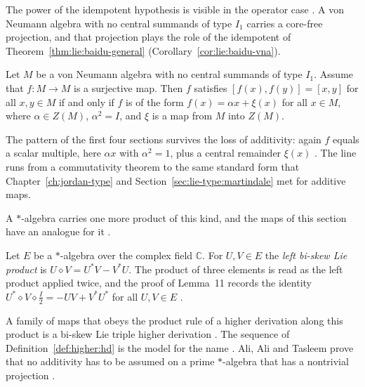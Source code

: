 The power of the idempotent hypothesis is visible in the operator case
\cite[p.~741]{BaiDu2014}. A von Neumann algebra with no central summands of
type $I_{1}$ carries a core-free projection, and that projection plays the
role of the idempotent of Theorem~\ref{thm:lie:baidu-general}
\cite[p.~741]{BaiDu2014} (Corollary~\ref{cor:lie:baidu-vna}).

\begin{corollary}\label{cor:lie:baidu-vna}
Let $M$ be a von Neumann algebra with no central summands of type $I_{1}$.
Assume that $f\colon M\to M$ is a surjective map. Then $f$ satisfies
$[f(x),f(y)]=[x,y]$ for all $x,y\in M$ if and only if $f$ is of the form
$f(x)=\alpha x+\xi(x)$ for all $x\in M$, where $\alpha\in Z(M)$,
$\alpha^{2}=I$, and $\xi$ is a map from $M$ into $Z(M)$.
\end{corollary}

The pattern of the first four sections survives the loss of additivity:
again $f$ equals a scalar multiple, here $\alpha x$ with $\alpha^{2}=1$,
plus a central remainder $\xi(x)$ \cite[p.~733]{BaiDu2014}. The line runs
from a commutativity theorem to the same standard form that
Chapter~\ref{ch:jordan-type} and
Section~\ref{sec:lie-type:martindale} met for additive maps.

A $*$-algebra carries one more product of this kind, and the maps of this
section have an analogue for it \cite[p.~127]{AliAliTasleem2026}.

\begin{definition}\label{def:lie:bi-skew-product}
Let $E$ be a $*$-algebra over the complex field $\mathbb{C}$. For $U,V\in E$
the \emph{left bi-skew Lie product} is $U\diamond V=U^{*}V-V^{*}U$. The product
of three elements is read as the left product applied twice, and the proof of
Lemma~11 records the identity
$U^{*}\diamond V\diamond\tfrac{I}{2}=-UV+V^{*}U^{*}$ for all $U,V\in E$
\cite[p.~136]{AliAliTasleem2026}.
\end{definition}

A family of maps that obeys the product rule of a higher derivation along this
product is a bi-skew Lie triple higher derivation
\cite[p.~128]{AliAliTasleem2026}. The sequence of
Definition~\ref{def:higher:hd} is the model for the name
\cite[p.~128]{AliAliTasleem2026}. Ali, Ali and Tasleem prove that no
additivity has to be assumed on a prime $*$-algebra that has a nontrivial
projection \cite[Main Theorem, p.~128]{AliAliTasleem2026}.

